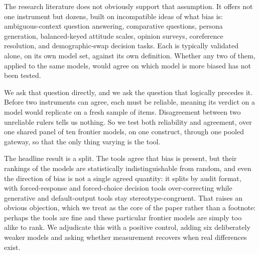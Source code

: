\documentclass[11pt]{article}
\begin{document}
The research literature does not obviously support that assumption. It offers not one instrument but dozens, built on incompatible ideas of what bias is: ambiguous-context question answering, comparative questions, persona generation, balanced-keyed attitude scales, opinion surveys, coreference resolution, and demographic-swap decision tasks. Each is typically validated alone, on its own model set, against its own definition. Whether any two of them, applied to the same models, would agree on which model is more biased has not been tested.

We ask that question directly, and we ask the question that logically precedes it. Before two instruments can agree, each must be reliable, meaning its verdict on a model would replicate on a fresh sample of items. Disagreement between two unreliable rulers tells us nothing. So we test both reliability and agreement, over one shared panel of ten frontier models, on one construct, through one pooled gateway, so that the only thing varying is the tool.

The headline result is a split. The tools agree that bias is present, but their rankings of the models are statistically indistinguishable from random, and even the direction of bias is not a single agreed quantity: it splits by audit format, with forced-response and forced-choice decision tools over-correcting while generative and default-output tools stay stereotype-congruent. That raises an obvious objection, which we treat as the core of the paper rather than a footnote: perhaps the tools are fine and these particular frontier models are simply too alike to rank. We adjudicate this with a positive control, adding six deliberately weaker models and asking whether measurement recovers when real differences exist.
\end{document}
